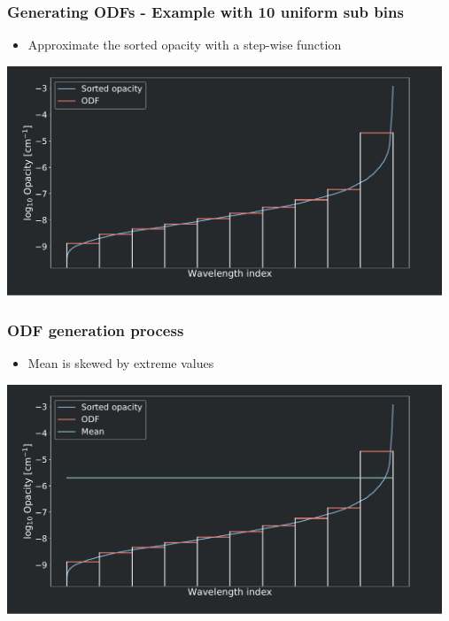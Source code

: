 \frame
{
	\frametitle{Generating ODFs - Example with 10 uniform sub bins}
	\begin{itemize}
		\item Approximate the sorted opacity with a step-wise function
	\end{itemize}
	\centering
	\includegraphics[width=130mm]{images/odf_generation_process_3}
}
\frame
{
	\frametitle{ODF generation process}
	\begin{itemize}
	\item Mean is skewed by extreme values
	\end{itemize}
	\centering
	\includegraphics[width=130mm]{images/odf_generation_process_4}
}

